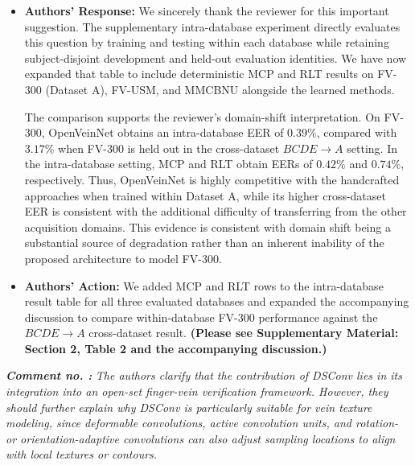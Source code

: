 \documentclass[11pt]{article}
\theoremstyle{remark}
\newcounter{mycounter} %
\newcommand\showReviewcounter{\stepcounter{mycounter}\themycounter}
\begin{document}
\begin{itemize}
    \item \textbf{Authors' Response:}
    We sincerely thank the reviewer for this important suggestion. The supplementary intra-database experiment directly evaluates this question by training and testing within each database while retaining subject-disjoint development and held-out evaluation identities. We have now expanded that table to include deterministic MCP and RLT results on FV-300 (Dataset A), FV-USM, and MMCBNU alongside the learned methods.

    The comparison supports the reviewer's domain-shift interpretation. On FV-300, OpenVeinNet obtains an intra-database EER of $0.39\%$, compared with $3.17\%$ when FV-300 is held out in the cross-dataset $BCDE \rightarrow A$ setting. In the intra-database setting, MCP and RLT obtain EERs of $0.42\%$ and $0.74\%$, respectively. Thus, OpenVeinNet is highly competitive with the handcrafted approaches when trained within Dataset A, while its higher cross-dataset EER is consistent with the additional difficulty of transferring from the other acquisition domains. This evidence is consistent with domain shift being a substantial source of degradation rather than an inherent inability of the proposed architecture to model FV-300.

    \item \textbf{Authors' Action:}
    We added MCP and RLT rows to the intra-database result table for all three evaluated databases and expanded the accompanying discussion to compare within-database FV-300 performance against the $BCDE \rightarrow A$ cross-dataset result. \textbf{(Please see Supplementary Material: Section 2, Table 2 and the accompanying discussion.)}
\end{itemize}

\color{blue}
\textbf{\textit{Comment no. \showReviewcounter:}}
\textit{The authors clarify that the contribution of DSConv lies in its integration into an open-set finger-vein verification framework. However, they should further explain why DSConv is particularly suitable for vein texture modeling, since deformable convolutions, active convolution units, and rotation- or orientation-adaptive convolutions can also adjust sampling locations to align with local textures or contours.}
\color{black}
\end{document}
